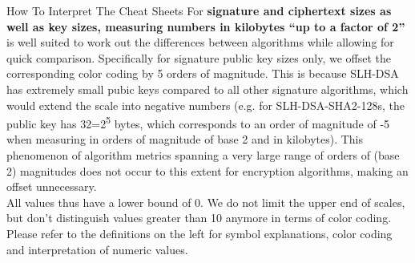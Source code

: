 \begin{minipage}[t]{0.58\textwidth}
\begin{algorithmbox}{How To Interpret The Cheat Sheets}
        For {\bfseries signature and ciphertext sizes as well as key sizes, measuring numbers in kilobytes ``up to a factor of 2''} is well suited to work out the differences between algorithms while allowing for quick comparison. Specifically for signature public key sizes only, we offset the corresponding color coding by 5 orders of magnitude. This is because SLH-DSA has extremely small pubic keys compared to all other signature algorithms, which would extend the scale into negative numbers (e.g. for SLH-DSA-SHA2-128s, the public key has 32=2\textsuperscript{5} bytes, which corresponds to an order of magnitude of -5 when measuring in orders of magnitude of base 2 and in kilobytes). This phenomenon of algorithm metrics spanning a very large range of orders of (base 2) magnitudes does not occur to this extent for encryption algorithms, making an offset unnecessary.\\[\baselineskip]

        All values thus have a lower bound of 0. We do not limit the upper end of scales, but don't distinguish values greater than 10 anymore in terms of color coding. Please refer to the definitions on the left for symbol explanations, color coding and interpretation of numeric values.
        \vspace{0.7cm}
    \end{algorithmbox}
\end{minipage}
